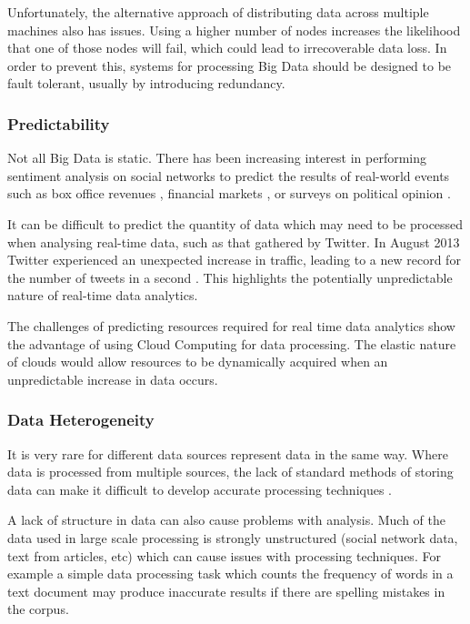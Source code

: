 Unfortunately, the alternative approach of distributing data across multiple machines also has issues. Using a higher number of nodes increases the likelihood that one of those nodes will fail, which could lead to irrecoverable data loss. In order to prevent this, systems for processing Big Data should be designed to be fault tolerant, usually by introducing redundancy.

\subsubsection{Predictability}
Not all Big Data is static. There has been increasing interest in performing sentiment analysis on social networks to predict the results of real-world events such as box office revenues \cite{asur2010predicting}, financial markets \cite{bollen2011twitter}, or surveys on political opinion \cite{o2010tweets}. 

It can be difficult to predict the quantity of data which may need to be processed when analysing real-time data, such as that gathered by Twitter. In August 2013 Twitter experienced an unexpected increase in traffic, leading to a new record for the number of tweets in a second \cite{tweetRecord}. This highlights the potentially unpredictable nature of real-time data analytics. 

The challenges of predicting resources required for real time data analytics show the advantage of using Cloud Computing for data processing. The elastic nature of clouds would allow resources to be dynamically acquired when an unpredictable increase in data occurs. 

\subsubsection{Data Heterogeneity}
It is very rare for different data sources represent data in the same way. Where data is processed from multiple sources, the lack of standard methods of storing data can make it difficult to develop accurate processing techniques \cite{cuzzocrea2011analytics}. 

A lack of structure in data can also cause problems with analysis. Much of the data used in large scale processing is strongly unstructured (social network data, text from articles, etc) which can cause issues with processing techniques. For example a simple data processing task which counts the frequency of words in a text document may produce inaccurate results if there are spelling mistakes in the corpus. 

